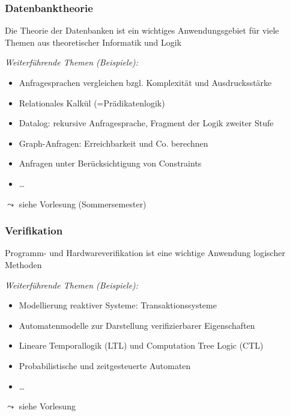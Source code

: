 \documentclass[aspectratio=1610,onlymath]{beamer}
\begin{document}
\begin{frame}\frametitle{Datenbanktheorie}

Die Theorie der Datenbanken ist ein wichtiges Anwendungsgebiet für
viele Themen aus theoretischer Informatik und Logik\bigskip

\emph{Weiterführende Themen (Beispiele):}
\begin{itemize}
\item Anfragesprachen vergleichen bzgl. Komplexität und Ausdrucksstärke
\item Relationales Kalkül (=Prädikatenlogik)
\item Datalog: rekursive Anfragesprache, Fragment der Logik zweiter Stufe
\item Graph-Anfragen: Erreichbarkeit und Co. berechnen
\item Anfragen unter Berücksichtigung von Constraints
\item \ldots
\end{itemize}

$\leadsto$ siehe Vorlesung  (Sommersemester)

\end{frame}

\begin{frame}\frametitle{Verifikation}

Programm- und Hardwareverifikation ist eine wichtige Anwendung logischer Methoden
\bigskip

\emph{Weiterführende Themen (Beispiele):}
\begin{itemize}
\item Modellierung reaktiver Systeme: Transaktionssysteme
\item Automatenmodelle zur Darstellung verifizierbarer Eigenschaften
\item Lineare Temporallogik (LTL) und Computation Tree Logic (CTL)
\item Probabilistische und zeitgesteuerte Automaten
\item \ldots
\end{itemize}

$\leadsto$ siehe Vorlesung 

\end{frame}
\end{document}
